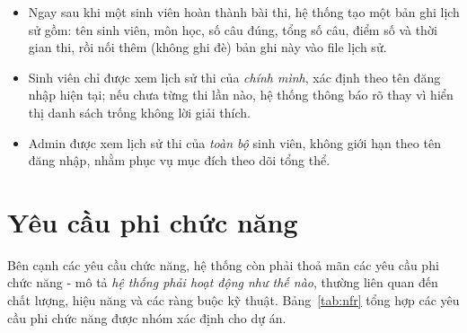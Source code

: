 \documentclass[11pt]{report}
\begin{document}
\begin{itemize}[leftmargin=*]
    \item Ngay sau khi một sinh viên hoàn thành bài thi, hệ thống tạo một bản ghi lịch sử gồm: tên sinh viên, môn học, số câu đúng, tổng số câu, điểm số và thời gian thi, rồi nối thêm (không ghi đè) bản ghi này vào file lịch sử.
    \item Sinh viên chỉ được xem lịch sử thi của \textit{chính mình}, xác định theo tên đăng nhập hiện tại; nếu chưa từng thi lần nào, hệ thống thông báo rõ thay vì hiển thị danh sách trống không lời giải thích.
    \item Admin được xem lịch sử thi của \textit{toàn bộ} sinh viên, không giới hạn theo tên đăng nhập, nhằm phục vụ mục đích theo dõi tổng thể.
\end{itemize}

\section{Yêu cầu phi chức năng}
\label{sec:ycphichucnang}

Bên cạnh các yêu cầu chức năng, hệ thống còn phải thoả mãn các yêu cầu phi chức năng - mô tả \textit{hệ thống phải hoạt động như thế nào}, thường liên quan đến chất lượng, hiệu năng và các ràng buộc kỹ thuật. Bảng~\ref{tab:nfr} tổng hợp các yêu cầu phi chức năng được nhóm xác định cho dự án.
\end{document}
